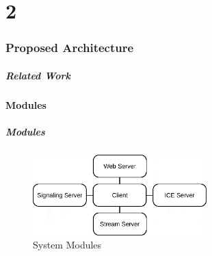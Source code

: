 \documentclass[t]{beamer}
\begin{document}


\part{2}
\section{Proposed Architecture}\label{arch}

\begin{frame}[t,shrink]
\frametitle{Related Work} 
\tableofcontents[part=1,currentsection,hideothersubsections]
\tableofcontents[part=2,currentsection,hideothersubsections]
\end{frame}

\subsection{Modules}

	\begin{frame}[c]
		\frametitle{Modules}
		\begin{figure}[H]
			\includegraphics[width=0.6\textwidth]{figures/archs.png}
			\caption{System Modules}
		\end{figure}
	\end{frame}
\end{document}
